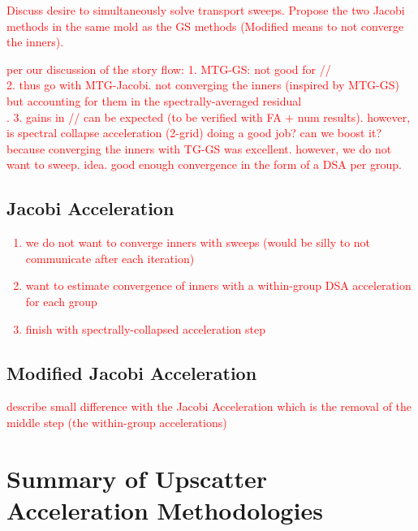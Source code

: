 \documentclass[preprint,10pt]{elsarticle}
\newcommand{\tcr}[1]{\textcolor{red}{#1}}
\begin{document}
\tcr{Discuss desire to simultaneously solve transport sweeps. Propose the two Jacobi methods in the same mold as the GS methods (Modified means to not converge the inners).}

\tcr
{
per our discussion of the story flow:
1. MTG-GS: not good for // \\
2. thus go with MTG-Jacobi. not converging the inners (inspired by MTG-GS) but accounting for them in the spectrally-averaged residual \\. 
3. gains in // can be expected (to be verified with FA + num results). however, is spectral collapse acceleration (2-grid) doing a good job? can we boost it? because converging the inners with TG-GS was excellent. however, we do not want to sweep. idea. good enough convergence in the form of a DSA per group.
}

\subsection{Jacobi Acceleration}
\tcr
{
\begin{enumerate}
\item we do not want to converge inners with sweeps (would be silly to not communicate after each iteration)
\item want to estimate convergence of inners with a within-group DSA acceleration for each group
\item finish with spectrally-collapsed acceleration step
\end{enumerate}
}

\subsection{Modified Jacobi Acceleration}

\tcr{describe small difference with the Jacobi Acceleration which is the removal of the middle step (the within-group accelerations)}

\section{Summary of Upscatter Acceleration Methodologies} \label{sec::summary}
\end{document}
